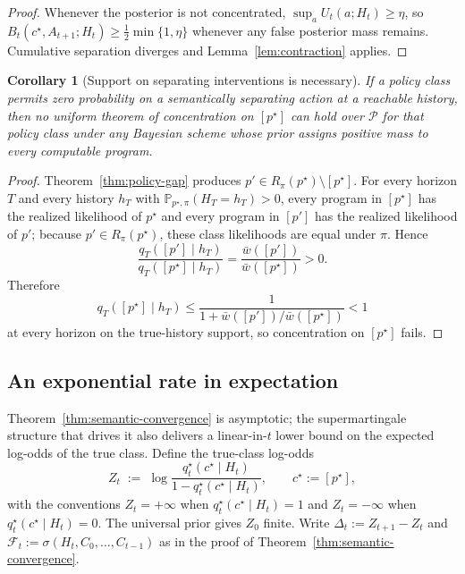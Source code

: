 \documentclass[11pt]{article}
\newtheorem{corollary}[theorem]{Corollary}
\theoremstyle{definition}
\theoremstyle{remark}
\newcommand{\Pcal}{\mathcal{P}}
\newcommand{\Prob}{\mathbb{P}}
\begin{document}
\begin{proof}
Whenever the posterior is not concentrated, $\sup_a U_t(a;H_t)\ge\eta$, so $B_t(c^\star,A_{t+1};H_t)\ge\tfrac{1}{2}\min\{1,\eta\}$ whenever any false posterior mass remains. Cumulative separation diverges and Lemma~\ref{lem:contraction} applies.
\end{proof}

\begin{corollary}[Support on separating interventions is necessary]
\label{cor:support-necessary}
If a policy class permits zero probability on a semantically separating action at a reachable history, then no uniform theorem of concentration on $[p^\star]$ can hold over $\Pcal$ for that policy class under any Bayesian scheme whose prior assigns positive mass to every computable program.
\end{corollary}

\begin{proof}
Theorem~\ref{thm:policy-gap} produces $p'\in R_\pi(p^\star)\setminus[p^\star]$. For every horizon $T$ and every history $h_T$ with $\Prob_{p^\star,\pi}(H_T=h_T)>0$, every program in $[p^\star]$ has the realized likelihood of $p^\star$ and every program in $[p']$ has the realized likelihood of $p'$; because $p'\in R_\pi(p^\star)$, these class likelihoods are equal under $\pi$. Hence
\[
\frac{q_T([p']\mid h_T)}{q_T([p^\star]\mid h_T)}
=
\frac{\bar w([p'])}{\bar w([p^\star])}
>0.
\]
Therefore
\[
q_T([p^\star]\mid h_T)\le \frac{1}{1+\bar w([p'])/\bar w([p^\star])}<1
\]
at every horizon on the true-history support, so concentration on $[p^\star]$ fails.
\end{proof}


\subsection{An exponential rate in expectation}
\label{sec:exp-rate}

Theorem~\ref{thm:semantic-convergence} is asymptotic; the supermartingale structure that drives it also delivers a linear-in-$t$ lower bound on the expected log-odds of the true class. Define the true-class log-odds
\[
Z_t\;:=\;\log\frac{q_t^\star(c^\star\mid H_t)}{1-q_t^\star(c^\star\mid H_t)},\qquad c^\star:=[p^\star],
\]
with the conventions $Z_t=+\infty$ when $q_t^\star(c^\star\mid H_t)=1$ and $Z_t=-\infty$ when $q_t^\star(c^\star\mid H_t)=0$. The universal prior gives $Z_0$ finite. Write $\Delta_t:=Z_{t+1}-Z_t$ and $\mathcal F_t:=\sigma(H_t,C_0,\dots,C_{t-1})$ as in the proof of Theorem~\ref{thm:semantic-convergence}.
\end{document}

